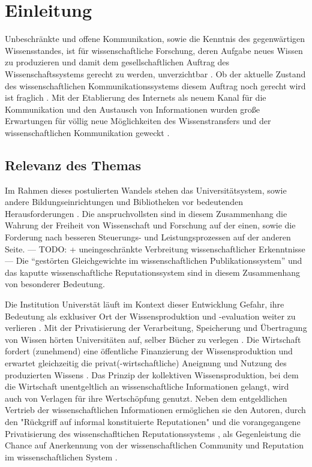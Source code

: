 \chapter{Einleitung}

Unbeschränkte und offene Kommunikation, sowie die Kenntnis des gegenwärtigen Wissensstandes, ist für wissenschaftliche Forschung, deren Aufgabe neues Wissen zu produzieren und damit dem gesellschaftlichen Auftrag des Wissenschaftssystems gerecht zu werden, unverzichtbar \cite{Hanekop_2014} \cite{glaeser2006} \cite{gibbons_1994} \cite{Luhmann1998}. Ob der aktuelle Zustand des wissenschaftlichen Kommunikationssystems diesem Auftrag noch gerecht wird ist fraglich \cite{Schekman_2013}. Mit der Etablierung des Internets als neuem Kanal für die Kommunikation und den Austausch von Informationen wurden große Erwartungen für völlig neue Möglichkeiten des Wissenstransfers und der wissenschaftlichen Kommunikation geweckt \cite{Hanekop_2014} \cite{schulze_2013_open} \cite{albert_2006_open_implications} \cite{Goodrum_2001} \cite{Lawrence_1999}.

\section{Relevanz des Themas}

Im Rahmen dieses postulierten Wandels stehen das Universitätsystem, sowie andere Bildungseinrichtungen und Bibliotheken vor bedeutenden Herausforderungen \cite{Harter2006} \cite{Gu_don_2004} \cite{osterloh2008anreize}. Die anspruchvollsten sind in diesem Zusammenhang die Wahrung der Freiheit von Wissenschaft und Forschung auf der einen, sowie die Forderung nach besseren Steuerungs- und Leistungsprozessen \cite{Adler_2009} \cite{gibbons_1994} auf der anderen Seite. --- TODO: + uneingeschränkte Verbreitung wissenschaftlicher Erkenntnisse --- Die “gestörten Gleichgewichte im wissenschaftlichen Publikationssystem” \cite{cite:0} und das kaputte wissenschaftliche Reputationssystem \cite{suchen} sind in diesem Zusammenhang von besonderer Bedeutung.

Die Institution Universtät läuft im Kontext dieser Entwicklung Gefahr, ihre Bedeutung als exklusiver Ort der Wissensproduktion und -evaluation weiter zu verlieren \cite{suchen}. Mit der Privatisierung der Verarbeitung, Speicherung und Übertragung von Wissen hörten Universitäten auf, selber Bücher zu verlegen \cite{cite:0}. Die Wirtschaft fordert (zunehmend) eine öffentliche Finanzierung der Wissensproduktion und erwartet gleichzeitig die privat(-wirtschaftliche) Aneignung und Nutzung des produzierten Wissens \cite{cite:2}. Das Prinzip der kollektiven Wissensproduktion, bei dem die Wirtschaft unentgeltlich an wissenschaftliche Informationen gelangt, wird auch von Verlagen für ihre Wertschöpfung genutzt. Neben dem entgeldlichen Vertrieb der wissenschaftlichen Informationen ermöglichen sie den Autoren, durch den "Rückgriff auf informal konstituierte Reputationen" \cite{luhmann_1970_selbststeuerung} und die vorangegangene Privatisierung des wissenschafltichen Reputationssystems \cite{suchen}, als Gegenleistung die Chance auf Anerkennung von der wissenschaftlichen Community und Reputation im wissenschaftlichen System \cite{cite:21a}.

